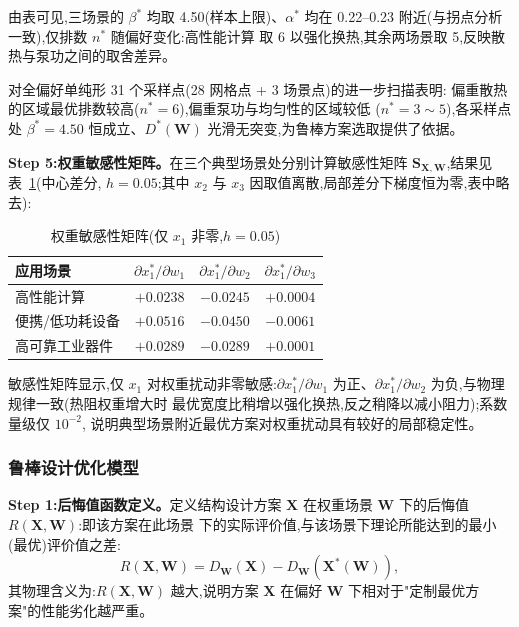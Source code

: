 由表可见,三场景的 $\beta^*$ 均取 4.50(样本上限)、$\alpha^*$ 均在
0.22--0.23 附近(与拐点分析一致),仅排数 $n^*$ 随偏好变化:高性能计算
取 6 以强化换热,其余两场景取 5,反映散热与泵功之间的取舍差异。

对全偏好单纯形 31 个采样点(28 网格点 + 3 场景点)的进一步扫描表明:
偏重散热的区域最优排数较高($n^*=6$),偏重泵功与均匀性的区域较低
($n^*=3\sim5$),各采样点处 $\beta^*=4.50$ 恒成立、$D^*(\mathbf{W})$
光滑无突变,为鲁棒方案选取提供了依据。

\textbf{Step 5:权重敏感性矩阵。}在三个典型场景处分别计算敏感性矩阵
$\mathbf{S}_{\mathbf{X},\mathbf{W}}$,结果见表~\ref{tab:weight-sens}(中心差分,
$h=0.05$;其中 $x_2$ 与 $x_3$ 因取值离散,局部差分下梯度恒为零,表中略去):

\begin{table}[htbp]
  \centering
  \caption{权重敏感性矩阵(仅 $x_1$ 非零,$h=0.05$)}
  \label{tab:weight-sens}
  \begin{tabular}{lccc}
    \toprule
    应用场景 & $\partial x_1^*/\partial w_1$ & $\partial x_1^*/\partial w_2$ & $\partial x_1^*/\partial w_3$ \\
    \midrule
    高性能计算 & $+0.0238$ & $-0.0245$ & $+0.0004$ \\
    便携/低功耗设备 & $+0.0516$ & $-0.0450$ & $-0.0061$ \\
    高可靠工业器件 & $+0.0289$ & $-0.0289$ & $+0.0001$ \\
    \bottomrule
  \end{tabular}
\end{table}

敏感性矩阵显示,仅 $x_1$ 对权重扰动非零敏感:$\partial x_1^*/\partial w_1$
为正、$\partial x_1^*/\partial w_2$ 为负,与物理规律一致(热阻权重增大时
最优宽度比稍增以强化换热,反之稍降以减小阻力);系数量级仅 $10^{-2}$,
说明典型场景附近最优方案对权重扰动具有较好的局部稳定性。
\subsubsection{鲁棒设计优化模型}

\textbf{Step 1:后悔值函数定义。}定义结构设计方案 $\mathbf{X}$ 在权重场景
$\mathbf{W}$ 下的后悔值 $R(\mathbf{X}, \mathbf{W})$:即该方案在此场景
下的实际评价值,与该场景下理论所能达到的最小(最优)评价值之差:
\begin{equation}
  R(\mathbf{X}, \mathbf{W}) = D_{\mathbf{W}}(\mathbf{X}) -
  D_{\mathbf{W}}\left( \mathbf{X}^*(\mathbf{W}) \right),
  \label{eq:regret}
\end{equation}
其物理含义为:$R(\mathbf{X}, \mathbf{W})$ 越大,说明方案 $\mathbf{X}$
在偏好 $\mathbf{W}$ 下相对于"定制最优方案"的性能劣化越严重。

